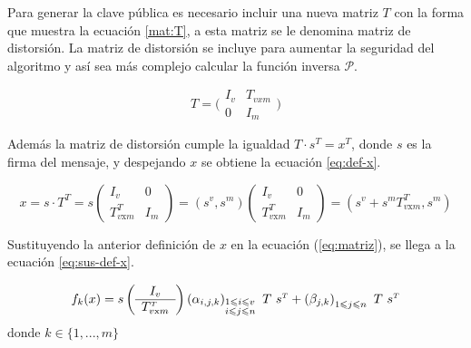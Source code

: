 Para generar la clave pública es necesario incluir una nueva matriz $T$ con la forma que muestra la ecuación \ref{mat:T}, a esta matriz se le denomina matriz de distorsión. La matriz de distorsión se incluye para aumentar la seguridad del algoritmo y así sea más complejo calcular la función inversa $\mathcal{P}$.

\begin{equation}
	T =
	\Bigg(
	\begin{array}{c|c}
	I_v & T_{vxm} \\
	\hline
	0 & I_m
	\end{array}
	\Bigg)
	\label{mat:T}
\end{equation}

Además la matriz de distorsión cumple la igualdad $T\cdot s^{\scriptscriptstyle T} = x ^{\scriptscriptstyle T}$, donde $s$ es la firma del mensaje, y despejando $x$ se obtiene la ecuación \ref{eq:def-x}.

\begin{equation}
	x =  s \cdot T^{\scriptscriptstyle T} = s  \left(
	\begin{array}{c|c}
	I_v & 0 \\
	\hline
	T^{\scriptscriptstyle T}_{v \mathrm{x} m} & I_m
	\end{array}
	\right)
	= \left(s^v, s^m\right) \left(
	\begin{array}{c|c}
	I_v & 0 \\
	\hline
	T^{\scriptscriptstyle T}_{v \mathrm{x} m} & I_m
	\end{array}
	\right)
	= \left(s^v + s^m T^{\scriptscriptstyle T}_{v\mathrm{x}m}, s^m \right)
	\label{eq:def-x}
\end{equation}

Sustituyendo la anterior definición de $x$ en la ecuación (\ref{eq:matriz}), se llega a la ecuación \ref{eq:sus-def-x}.

\begin{equation}
	f_k(x) = s  
	\left(\begin{array}{c}
		I_v \\
		\hline
		T^{\scriptscriptstyle T}_{v \mathrm{x} m}
	\end{array}\right)
	\left(\alpha_{i,j,k}\right)_{\begin{subarray}{l}{1\leqslant i \leqslant v }\\ {i \leqslant j \leqslant n}\end{subarray}}\ T \ s^{\scriptscriptstyle T} + 
	\left(\beta_{j,k}\right)_{1\leqslant j\leqslant n}\ T\ s^{\scriptscriptstyle T}
	\label{eq:sus-def-x}
\end{equation}
donde $k \in \{1,...,m\}$

